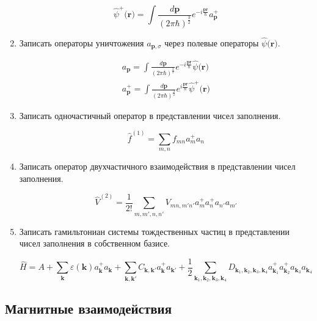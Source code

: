 \documentclass{article}
\begin{document}
\begin{enumerate}
	\begin{equation}
		\hat{\psi}^+(\textbf{r)} = \int \frac{d\textbf{p}}{(2\pi\hbar)^\frac{3}{2}} e^{-i\frac{\textbf{pr}}{\hbar}}a^+_\textbf{p}
	\end{equation}
	
	\item {Записать операторы уничтожения $a_{\textbf{p},\sigma}$ через полевые операторы $\hat{\psi}(\textbf{r)}$.}
	
	\begin{gather}
		a_\textbf{p} = \int \frac{d\textbf{p}}{(2\pi\hbar)^\frac{3}{2}} e^{-i\frac{\textbf{pr}}{\hbar}} \hat{\psi}(\textbf{r)} \\
		a^+_\textbf{p} = \int \frac{d\textbf{p}}{(2\pi\hbar)^\frac{3}{2}} e^{i\frac{\textbf{pr}}{\hbar}} \hat{\psi}^+(\textbf{r)}
	\end{gather}
	
	\item {Записать одночастичный оператор в представлении чисел заполнения.}
	
	\begin{equation}
		\hat{f}^{(1)} = \sum\limits_{m,n} f_{mn} a^+_m a_n
	\end{equation}
	
	\item {Записать оператор двухчастичного взаимодействия в представлении чисел заполнения.}
	
	\begin{equation}
		\hat{V}^{(2)} = \frac{1}{2!}\sum\limits_{m,m',n,n'} V_{mn,m'n'} a^+_m a^+_n a_{n'}a_{m'}
	\end{equation}
	
	\item {Записать гамильтониан системы тождественных частиц в представлении чисел заполнения
в собственном базисе.}

	\begin{equation}
		\hat{H} = A + \sum\limits_{\textbf{k}}\varepsilon(\textbf{k}) a^+_{\textbf{k}}a_{\textbf{k}} + \sum\limits_{\textbf{k},\textbf{k}'}C_{\textbf{k},\textbf{k}'} a^+_{\textbf{k}}a_{\textbf{k}'} + \frac{1}{2}\sum\limits_{\textbf{k}_1,\textbf{k}_2,\textbf{k}_3,\textbf{k}_4}D_{\textbf{k}_1,\textbf{k}_2,\textbf{k}_3,\textbf{k}_4} a^+_{\textbf{k}_1}a^+_{\textbf{k}_2}a_{\textbf{k}_3}a_{\textbf{k}_4}
	\end{equation}
\end{enumerate}

\subsection*{Магнитные взаимодействия}
\end{document}
